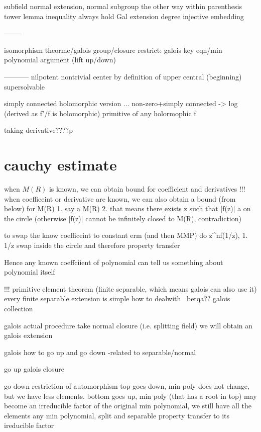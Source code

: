 {{subfield normal extension, normal subgroup the other way within parenthesis
tower lemma
inequality always hold Gal \leq extension degree
injective embedding



--------





isomorphism theorme/galois group/closure
restrict: galois key eqn/min polynomial argument (lift up/down)

-----------
nilpotent nontrivial center by definition of upper central (beginning)
supersolvable 


simply connected
    holomorphic version
    ...
non-zero+simply connected -> log (derived as f'/f is holomorphic)
primitive of any holormophic f

taking derivative????p


\section*{cauchy estimate}

when $M(R)$ is known, we can obtain bound for coefficient and derivatives
!!! when coefficeint or derivative are known, we can also obtain a bound (from below) for M(R)
    1. say a \leq M(R)
    2. that means there exists z such that |f(z)| \geq a on the circle (otherwise |f(z)| cannot be infinitely closed to M(R), contradiction)
   
to swap the know  coefficeint to constant erm (and then MMP)
do z^nf(1/z), 1. 1/z swap inside the circle and therefore property transfer

Hence any known coeffciient of polynomial can tell us something about polynomial itself




!!! primitive element theorem (finite separable, which means galois can also use it) 
every finite separable extension is simple
how to dealwith \alpha\ betqa?? galois collection


   galois actual procedure 
take normal closure (i.e. splitting field) we will obtain an galois extension


   galois how to go up and go down -related to separable/normal
   
   go up galois closure
   
   
   go down 
    restriction of automorphism 
    top goes down, min poly does not change, but we have less elements.
    bottom goes up,
        min poly (that has a root in top) may become an irreducible factor of the original min polynomial, we still have all the elements
        any min polynomial, split and separable property transfer to its ireducible factor
    
}}
